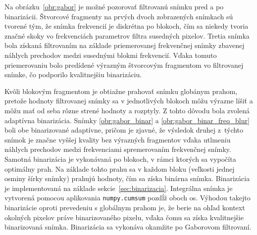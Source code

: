   Na obrázku~{\ref{obr:gabor}}
  je možné pozorovať filtrovanú snímku pred a po binarizácii. Štvorcové fragmenty na prvých dvoch zobrazených snímkach sú tvorené tým, že snímka frekvencií je
  diskrétna po blokoch, čím sa niekedy tvoria značné skoky vo frekvenciách parametrov filtra susedných pixelov. Tretia snímka bola získaná filtrovaním na základe
  priemerovanej frekvenčnej snímky zbavenej náhlych prechodov medzi susednými blokmi frekvencií. Vďaka tomuto priemerovaniu bolo predídené výrazným štvorcovým
  fragmentom vo filtrovanej snímke, čo podporilo kvalitnejšiu binarizáciu.

  Kvôli blokovým fragmentom je obtiažne prahovať snímku globánym prahom, pretože hodnoty filtrovanej snímky sa v jednotlivých blokoch môžu výrazne líšiť a môžu
  mať od seba rôzne strené hodnoty a rozptyly. Z tohto dôvodu bola zvolená adaptívna binarizácia. Snímky \ref{obr:gabor_binar} a
  \ref{obr:gabor_binar_freq_blur} boli obe binarizované adaptívne, pričom je zjavné, že výsledok druhej z~týchto snímok je značne vyššej kvality bez výrazných
  fragmentov vďaka utlmeniu náhlych prechodov medzi frekvenciami spremerovaním frekvenčnej snímky. Samotná binarizácia je vykonávaná po blokoch, v rámci ktorých
  sa vypočíta optimálny prah. Na základe tohto prahu sa v každom bloku (veľkosti jednej osminy šírky snímky) prahujú hodnoty,
  čím sa získa binárna snímka. Binarizácia je implementovaná na základe sekcie~{\ref{sec:binarizacia}}. Integrálna snímka je vytvorená pomocou
  aplikovania \texttt{numpy.cumsum} pozdĺž oboch os. Výhodou takejto binarizácie oproti prevedeniu
  s globálnym prahom je, že berie na ohľad kontext okolných pixelov práve binarizovaného pixelu, vďaka čomu sa získa kvalitnejšie binarizovaná snímka.
  Binarizácia sa vykonáva okamžite po Gaborovom filtrovaní.


